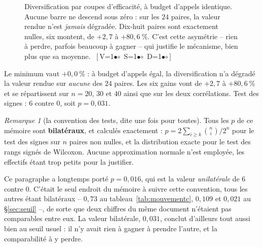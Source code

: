 \documentclass[11pt,a4paper]{article}
\theoremstyle{plain}
\theoremstyle{remark}
\newtheorem{remark}{Remarque}
\newcommand{\cfgm}[1]{\ifnum#1=1$\bullet$\else$\circ$\fi}
\newcommand{\conf}[3]{%
  \textsf{\footnotesize[\,V\cfgm{#1}\ S\cfgm{#2}\ D\cfgm{#3}\,]}}
\begin{document}
\begin{figure}[H]
\centering
{}
\caption{Diversification par coupes d'efficacité, à budget d'appels
identique. Aucune barre ne descend sous zéro : sur les $24$ paires, la
valeur rendue n'est \emph{jamais} dégradée. Dix-huit paires sont
exactement nulles, six montent, de $+2{,}7$ à $+80{,}6\ \%$. C'est cette
asymétrie -- rien à perdre, parfois beaucoup à gagner -- qui justifie le
mécanisme, bien plus que sa moyenne.\ \conf{0}{0}{0}}
\label{fig:divers}
\end{figure}

\noindent
Le minimum vaut $+0{,}0\ \%$ : à budget d'appels égal, la diversification
n'a dégradé la valeur rendue sur \emph{aucune} des $24$ paires. Les six
gains vont de $+2{,}7$ à $+80{,}6\ \%$ et se répartissent sur $n=20$, $30$
et $40$ ainsi que sur les deux corrélations. Test des signes : $6$ contre $0$, soit $p=0{,}031$.

\begin{remark}[la convention des tests, dite une fois pour toutes]
\label{rem:bilateral}
Tous les $p$ de ce mémoire sont \textbf{bilatéraux}, et calculés
exactement : $p=2\sum_{i\ge k}\binom{n}{i}/2^{n}$ pour le test des signes
sur $n$ paires non nulles, et la distribution exacte pour le test des rangs
signés de Wilcoxon. Aucune approximation normale n'est employée, les
effectifs étant trop petits pour la justifier.

Ce paragraphe a longtemps porté $p=0{,}016$, qui est la valeur
\emph{unilatérale} de $6$ contre $0$. C'était le seul endroit du mémoire à
suivre cette convention, tous les autres étant bilatéraux -- $0{,}73$ au
tableau~\ref{tab:mouvementc}, $0{,}109$ et $0{,}021$ au
§\ref{sec:seuil} --, de sorte que deux chiffres du même document n'étaient
pas comparables entre eux. La valeur bilatérale, $0{,}031$, conclut
d'ailleurs tout aussi bien au seuil usuel : il n'y avait rien à gagner à
prendre l'autre, et la comparabilité à y perdre.
\end{remark}
\end{document}
